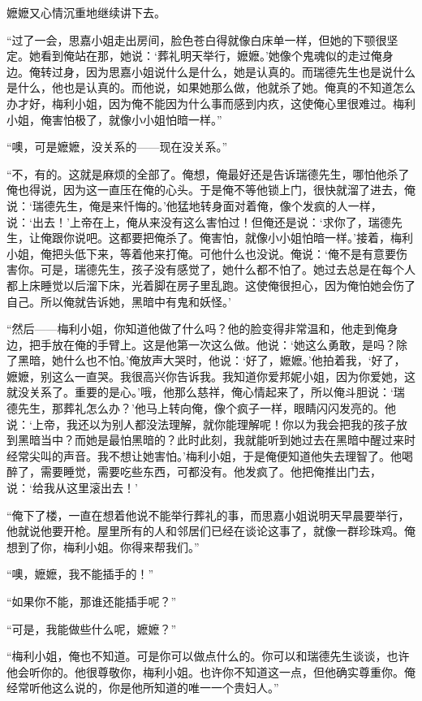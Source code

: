 \par 嬷嬷又心情沉重地继续讲下去。
\par “过了一会，思嘉小姐走出房间，脸色苍白得就像白床单一样，但她的下颚很坚定。她看到俺站在那，她说：‘葬礼明天举行，嬷嬷。’她像个鬼魂似的走过俺身边。俺转过身，因为思嘉小姐说什么是什么，她是认真的。而瑞德先生也是说什么是什么，他也是认真的。而他说，如果她那么做，他就杀了她。俺真的不知道怎么办才好，梅利小姐，因为俺不能因为什么事而感到内疚，这使俺心里很难过。梅利小姐，俺害怕极了，就像小小姐怕暗一样。”
\par “噢，可是嬷嬷，没关系的——现在没关系。”
\par “不，有的。这就是麻烦的全部了。俺想，俺最好还是告诉瑞德先生，哪怕他杀了俺也得说，因为这一直压在俺的心头。于是俺不等他锁上门，很快就溜了进去，俺说：‘瑞德先生，俺是来忏悔的。’他猛地转身面对着俺，像个发疯的人一样，说：‘出去！’上帝在上，俺从来没有这么害怕过！但俺还是说：‘求你了，瑞德先生，让俺跟你说吧。这都要把俺杀了。俺害怕，就像小小姐怕暗一样。’接着，梅利小姐，俺把头低下来，等着他来打俺。可他什么也没说。俺说：‘俺不是有意要伤害你。可是，瑞德先生，孩子没有感觉了，她什么都不怕了。她过去总是在每个人都上床睡觉以后溜下床，光着脚在房子里乱跑。这使俺很担心，因为俺怕她会伤了自己。所以俺就告诉她，黑暗中有鬼和妖怪。’
\par “然后——梅利小姐，你知道他做了什么吗？他的脸变得非常温和，他走到俺身边，把手放在俺的手臂上。这是他第一次这么做。他说：‘她这么勇敢，是吗？除了黑暗，她什么也不怕。’俺放声大哭时，他说：‘好了，嬷嬷。’他拍着我，‘好了，嬷嬷，别这么一直哭。我很高兴你告诉我。我知道你爱邦妮小姐，因为你爱她，这就没关系了。重要的是心。’哦，他那么慈祥，俺心情起来了，所以俺斗胆说：‘瑞德先生，那葬礼怎么办？’他马上转向俺，像个疯子一样，眼睛闪闪发亮的。他说：‘上帝，我还以为别人都没法理解，就你能理解呢！你以为我会把我的孩子放到黑暗当中？而她是最怕黑暗的？此时此刻，我就能听到她过去在黑暗中醒过来时经常尖叫的声音。我不想让她害怕。’梅利小姐，于是俺便知道他失去理智了。他喝醉了，需要睡觉，需要吃些东西，可都没有。他发疯了。他把俺推出门去，说：‘给我从这里滚出去！’
\par “俺下了楼，一直在想着他说不能举行葬礼的事，而思嘉小姐说明天早晨要举行，他就说他要开枪。屋里所有的人和邻居们已经在谈论这事了，就像一群珍珠鸡。俺想到了你，梅利小姐。你得来帮我们。”
\par “噢，嬷嬷，我不能插手的！”
\par “如果你不能，那谁还能插手呢？”
\par “可是，我能做些什么呢，嬷嬷？”
\par “梅利小姐，俺也不知道。可是你可以做点什么的。你可以和瑞德先生谈谈，也许他会听你的。他很尊敬你，梅利小姐。也许你不知道这一点，但他确实尊重你。俺经常听他这么说的，你是他所知道的唯一一个贵妇人。”
